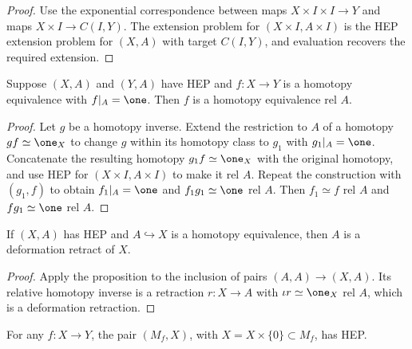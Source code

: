 \begin{proof}
\leanok
\sketch Use the exponential correspondence between maps
$X\times I\times I\to Y$ and maps $X\times I\to C(I,Y)$. The extension problem
for $(X\times I,A\times I)$ is the HEP extension problem for $(X,A)$ with target
$C(I,Y)$, and evaluation recovers the required extension.
\end{proof}

\begin{proposition}
\label{prop:hep-homotopy-equivalence-rel-a}
\leanok
{}
Suppose $(X,A)$ and $(Y,A)$ have HEP and $f:X\to Y$ is a homotopy equivalence with
$f|_A=\one$. Then $f$ is a homotopy equivalence rel $A$.
\end{proposition}

\begin{proof}
\leanok
\sketch Let $g$ be a homotopy inverse. Extend the restriction to $A$ of a homotopy
$gf\simeq\one_X$ to change $g$ within its homotopy class to $g_1$ with
$g_1|_A=\one$. Concatenate the resulting homotopy $g_1f\simeq\one_X$ with the
original homotopy, and use HEP for $(X\times I,A\times I)$ to make it rel $A$.
Repeat the construction with $(g_1,f)$ to obtain $f_1|_A=\one$ and
$f_1g_1\simeq\one$ rel $A$. Then $f_1\simeq f$ rel $A$ and
$fg_1\simeq\one$ rel $A$.
\end{proof}

\begin{corollary}
\label{cor:hep-inclusion-homotopy-equiv-deformation-retract}
\leanok
{}
If $(X,A)$ has HEP and $A\hookrightarrow X$ is a homotopy equivalence, then $A$ is
a deformation retract of $X$.
\end{corollary}

\begin{proof}
\leanok
\sketch Apply the proposition to the inclusion of pairs $(A,A)\to(X,A)$. Its
relative homotopy inverse is a retraction $r:X\to A$ with $\iota r\simeq\one_X$
rel $A$, which is a deformation retraction.
\end{proof}

\begin{lemma}
\label{lem:mapping-cylinder-pair-hep}
\leanok
{}
For any $f:X\to Y$, the pair $(M_f,X)$, with $X=X\times\{0\}\subset M_f$, has HEP.
\end{lemma}

